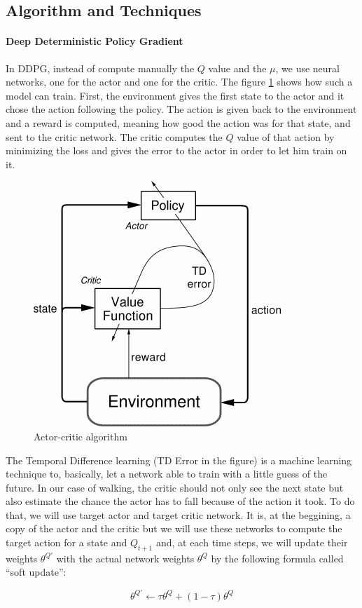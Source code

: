 \documentclass{article}
\begin{document}
\subsection{Algorithm and Techniques}

\paragraph{Deep Deterministic Policy Gradient}

In DDPG, instead of compute manually the $Q$ value and the $\mu$, we
use neural networks, one for the actor and one for the critic. The figure
\ref{fig:actor-critic} shows how such a model can train. First, the environment
gives the first state to the actor and it chose the action following the policy.
The action is given back to the environment and a reward is computed, meaning
how good the action was for that state, and sent to the critic network. The
critic computes the $Q$ value of that action by minimizing the loss and gives
the error to the actor in order to let him train on it.

\begin{figure}[ht!]
  \centering
  \includegraphics[width=.28\textwidth]{actor-critic}
  \caption{Actor-critic algorithm}
  \label{fig:actor-critic}
\end{figure}

The Temporal Difference learning (TD Error in the figure) is a machine learning
technique to, basically, let a network able to train with a little guess of the
future. In our case of walking, the critic should not only see the next state
but also estimate the chance the actor has to fall because of the action it
took. To do that, we will use target actor and target critic network. It is, at
the beggining, a copy of the actor and the critic but we will use these networks
to compute the target action for a state and $Q_{t+1}$ and, at each time steps,
we will update their weights $\theta^{Q'}$ with the actual network weights
$\theta^Q$ by the following formula called ``soft update'':  

\begin{equation}
\theta^{Q'} \leftarrow \tau\theta^Q + (1 - \tau)\theta^Q
\end{equation}
\end{document}
